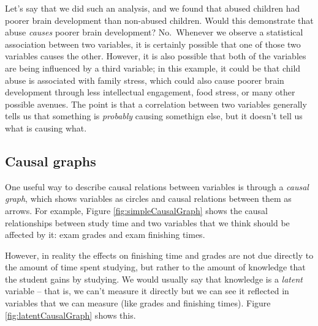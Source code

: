 \documentclass[
  12pt,
]{book}
\begin{document}
Let's say that we did such an analysis, and we found that abused children had poorer brain development than non-abused children. Would this demonstrate that abuse \emph{causes} poorer brain development? No.~Whenever we observe a statistical association between two variables, it is certainly possible that one of those two variables causes the other. However, it is also possible that both of the variables are being influenced by a third variable; in this example, it could be that child abuse is associated with family stress, which could also cause poorer brain development through less intellectual engagement, food stress, or many other possible avenues. The point is that a correlation between two variables generally tells us that something is \emph{probably} causing somethign else, but it doesn't tell us what is causing what.

\hypertarget{causal-graphs}{%
\subsection{Causal graphs}\label{causal-graphs}}

One useful way to describe causal relations between variables is through a \emph{causal graph}, which shows variables as circles and causal relations between them as arrows. For example, Figure \ref{fig:simpleCausalGraph} shows the causal relationships between study time and two variables that we think should be affected by it: exam grades and exam finishing times.

However, in reality the effects on finishing time and grades are not due directly to the amount of time spent studying, but rather to the amount of knowledge that the student gains by studying. We would usually say that knowledge is a \emph{latent} variable -- that is, we can't measure it directly but we can see it reflected in variables that we can measure (like grades and finishing times). Figure \ref{fig:latentCausalGraph} shows this.
\end{document}
